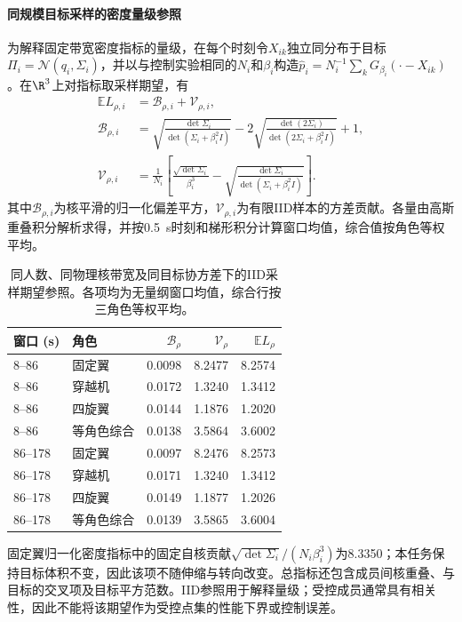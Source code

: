\paragraph{同规模目标采样的密度量级参照}
为解释固定带宽密度指标的量级，在每个时刻令$X_{ik}$独立同分布于目标$\Pi_i=\mathcal N(q_i,\Sigma_i)$，并以与控制实验相同的$N_i$和$\beta_i$构造$\widehat p_i=N_i^{-1}\sum_kG_{\beta_i}(\cdot-X_{ik})$。在$\R^3$上对指标取采样期望，有
\begin{equation}
\begin{aligned}
\mathbb E L_{\rho,i}&=\mathcal B_{\rho,i}+\mathcal V_{\rho,i},\\
\mathcal B_{\rho,i}&=\sqrt{\frac{\det\Sigma_i}{\det(\Sigma_i+\beta_i^2I)}}-2\sqrt{\frac{\det(2\Sigma_i)}{\det(2\Sigma_i+\beta_i^2I)}}+1,\\
\mathcal V_{\rho,i}&=\frac1{N_i}\left[\frac{\sqrt{\det\Sigma_i}}{\beta_i^3}-\sqrt{\frac{\det\Sigma_i}{\det(\Sigma_i+\beta_i^2I)}}\right].
\end{aligned}
\label{eq:iid-density-reference}
\end{equation}
其中$\mathcal B_{\rho,i}$为核平滑的归一化偏差平方，$\mathcal V_{\rho,i}$为有限IID样本的方差贡献。各量由高斯重叠积分解析求得，并按0.5~s时刻和梯形积分计算窗口均值，综合值按角色等权平均。
\begin{table}[htbp]\centering\small
\caption{同人数、同物理核带宽及同目标协方差下的IID采样期望参照。各项均为无量纲窗口均值，综合行按三角色等权平均。}\label{tab:iid-density-reference}
\begin{tabular}{llrrr}\toprule
窗口 (s) & 角色 & $\mathcal B_{\rho}$ & $\mathcal V_{\rho}$ & $\mathbb E L_{\rho}$\\\midrule
8--86 & 固定翼 & 0.0098 & 8.2477 & 8.2574\\
8--86 & 穿越机 & 0.0172 & 1.3240 & 1.3412\\
8--86 & 四旋翼 & 0.0144 & 1.1876 & 1.2020\\
8--86 & 等角色综合 & 0.0138 & 3.5864 & 3.6002\\
\midrule
86--178 & 固定翼 & 0.0097 & 8.2476 & 8.2573\\
86--178 & 穿越机 & 0.0171 & 1.3240 & 1.3412\\
86--178 & 四旋翼 & 0.0149 & 1.1877 & 1.2026\\
86--178 & 等角色综合 & 0.0139 & 3.5865 & 3.6004\\
\bottomrule\end{tabular}\end{table}
固定翼归一化密度指标中的固定自核贡献$\sqrt{\det\Sigma_i}/(N_i\beta_i^3)$为8.3350；本任务保持目标体积不变，因此该项不随伸缩与转向改变。总指标还包含成员间核重叠、与目标的交叉项及目标平方范数。IID参照用于解释量级；受控成员通常具有相关性，因此不能将该期望作为受控点集的性能下界或控制误差。
